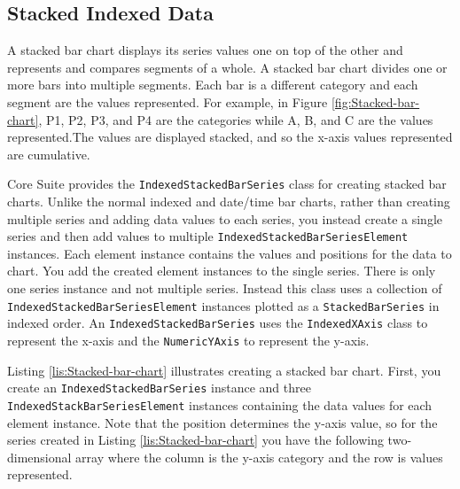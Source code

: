 \documentclass[american]{tufte-book}
\numberwithin{equation}{section}
\numberwithin{figure}{section}
\begin{document}
{\subsection{Stacked Indexed Data}\label{subsec:Stacked-Indexed-Data}

A stacked bar chart displays its series values one on top of the other
and represents and compares segments of a whole. A stacked bar chart
divides one or more bars into multiple segments. Each bar is a different
category and each segment are the values represented. For example,
in Figure \ref{fig:Stacked-bar-chart}, P1, P2, P3, and P4 are the
categories while A, B, and C are the values represented.The values
are displayed stacked, and so the x-axis values represented are cumulative. 

Core Suite provides the \texttt{IndexedStackedBarSeries} class for
creating stacked bar charts. Unlike the normal indexed and date/time
bar charts, rather than creating multiple series and adding data values
to each series, you instead create a single series and then add values
to multiple \texttt{IndexedStackedBarSeriesElement} instances. Each
element instance contains the values and positions for the data to
chart. You add the created element instances to the single series.
There is only one series instance and not multiple series. Instead this class uses a collection of \texttt{IndexedStackedBarSeriesElement}
instances plotted as a \texttt{StackedBarSeries} in indexed order.
An \texttt{IndexedStackedBarSeries} uses the \texttt{IndexedXAxis}
class to represent the x-axis and the \texttt{NumericYAxis} to represent
the y-axis.

Listing \ref{lis:Stacked-bar-chart} illustrates creating a stacked
bar chart. First, you create an \texttt{IndexedStackedBarSeries} instance
and three \texttt{IndexedStackBarSeriesElement} instances containing
the data values for each element instance. Note that the position
determines the y-axis value, so for the series created in Listing
\ref{lis:Stacked-bar-chart} you have the following two-dimensional
array where the column is the y-axis category and the row is values
represented.

}
\end{document}
